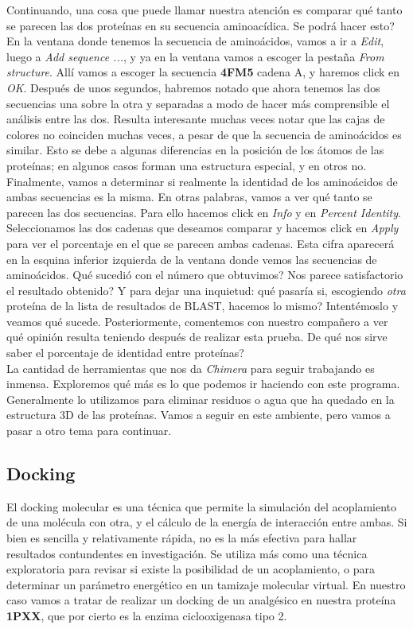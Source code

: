 \documentclass[10pt,letterpaper]{article}
\begin{document}
Continuando, una cosa que puede llamar nuestra atenci\'on es comparar qu\'e tanto se parecen las dos prote\'inas en su secuencia aminoac\'idica. Se podr\'a hacer esto? En la ventana donde tenemos la secuencia de amino\'acidos, vamos a ir a \emph{Edit}, luego a \emph{Add sequence ...}, y ya en la ventana vamos a escoger la pesta\~na \emph{From structure}. All\'i vamos a escoger la secuencia \textbf{4FM5} cadena A, y haremos click en \emph{OK}. Despu\'es de unos segundos, habremos notado que ahora tenemos las dos secuencias una sobre la otra y separadas a modo de hacer m\'as comprensible el an\'alisis entre las dos. Resulta interesante muchas veces notar que las cajas de colores no coinciden muchas veces, a pesar de que la secuencia de amino\'acidos es similar. Esto se debe a algunas diferencias en la posici\'on de los \'atomos de las prote\'inas; en algunos casos forman una estructura especial, y en otros no.\\

Finalmente, vamos a determinar si realmente la identidad de los amino\'acidos de ambas secuencias es la misma. En otras palabras, vamos a ver qu\'e tanto se parecen las dos secuencias. Para ello hacemos click en \emph{Info} y en \emph{Percent Identity}. Seleccionamos las dos cadenas que deseamos comparar y hacemos click en \emph{Apply} para ver el porcentaje en el que se parecen ambas cadenas. Esta cifra aparecer\'a en la esquina inferior izquierda de la ventana donde vemos las secuencias de amino\'acidos. Qu\'e sucedi\'o con el n\'umero que obtuvimos? Nos parece satisfactorio el resultado obtenido? Y para dejar una inquietud: qu\'e pasar\'ia si, escogiendo \emph{otra} prote\'ina de la lista de resultados de BLAST, hacemos lo mismo? Intent\'emoslo y veamos qu\'e sucede. Posteriormente, comentemos con nuestro compa\~nero a ver qu\'e opini\'on resulta teniendo despu\'es de realizar esta prueba. De qu\'e nos sirve saber el porcentaje de identidad entre prote\'inas?\\

La cantidad de herramientas que nos da \textit{Chimera} para seguir trabajando es inmensa. Exploremos qu\'e m\'as es lo que podemos ir haciendo con este programa. Generalmente lo utilizamos para eliminar residuos o agua que ha quedado en la estructura 3D de las prote\'inas. Vamos a seguir en este ambiente, pero vamos a pasar a otro tema para continuar.

\subsection{Docking}
El docking molecular es una t\'ecnica que permite la simulaci\'on del acoplamiento de una mol\'ecula con otra, y el c\'alculo de la energ\'ia de interacci\'on entre ambas. Si bien es sencilla y relativamente r\'apida, no es la m\'as efectiva para hallar resultados contundentes en investigaci\'on. Se utiliza m\'as como una t\'ecnica exploratoria para revisar si existe la posibilidad de un acoplamiento, o para determinar un par\'ametro energ\'etico en un tamizaje molecular virtual. En nuestro caso vamos a tratar de realizar un docking de un analg\'esico en nuestra prote\'ina \textbf{1PXX}, que por cierto es la enzima ciclooxigenasa tipo 2.\\
\end{document}
